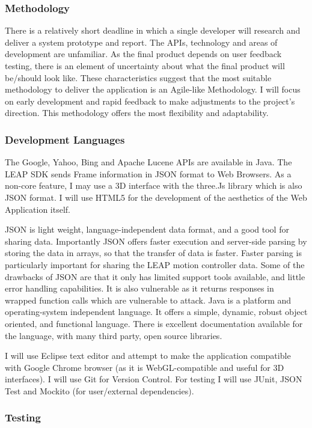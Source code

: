 \documentclass[a4paper, 10pt]{article}
\begin{document}
\subsubsection{Methodology}
There is a relatively short deadline in which a single developer will research and deliver a system prototype and report. The APIs, technology and areas of development are unfamiliar. As the final product depends on user feedback testing, there is an element of uncertainty about what the final product will be/should look like. These characteristics suggest that the most suitable methodology to deliver the application is an Agile-like Methodology. I will focus on early development and rapid feedback to make adjustments to the project's direction. This methodology offers the most flexibility and adaptability.


\subsubsection{Development Languages}
The Google, Yahoo, Bing and Apache Lucene APIs are available in Java. The LEAP SDK sends Frame information in JSON format to Web Browsers. As a non-core feature, I may use a 3D interface with the three.Js library which is also JSON format. I will use HTML5 for the development of the aesthetics of the Web Application itself.

JSON is light weight, language-independent data format, and a good tool for sharing data. Importantly JSON offers faster execution and server-side parsing by storing the data in arrays, so that the transfer of data is faster. Faster parsing is particularly important for sharing the LEAP motion controller data. Some of the drawbacks of JSON are that it only has limited support tools available, and little error handling capabilities. It is also vulnerable as it returns responses in wrapped function calls which are vulnerable to attack. Java is a platform and operating-system independent language. It offers a simple, dynamic, robust object oriented, and functional language. There is excellent documentation available for the language, with many third party, open source libraries.

I will use Eclipse text editor and attempt to make the application compatible with Google Chrome browser (as it is WebGL-compatible and useful for 3D interfaces). I will use Git for Version Control. For testing I will use JUnit, JSON Test and Mockito (for user/external dependencies).

\subsubsection{Testing}
\end{document}
